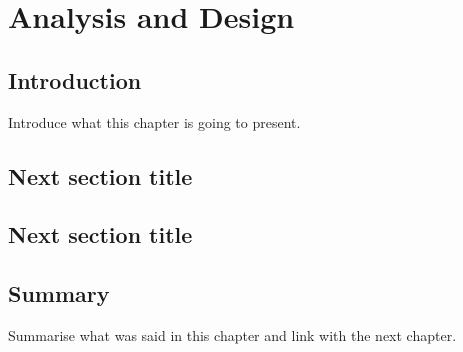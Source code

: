 \chapter{Analysis and Design}

\section{Introduction}
Introduce what this chapter is going to present.
\section{Next section title}

\section{Next section title}

\section{Summary}
Summarise what was said in this chapter and link with the next chapter.
